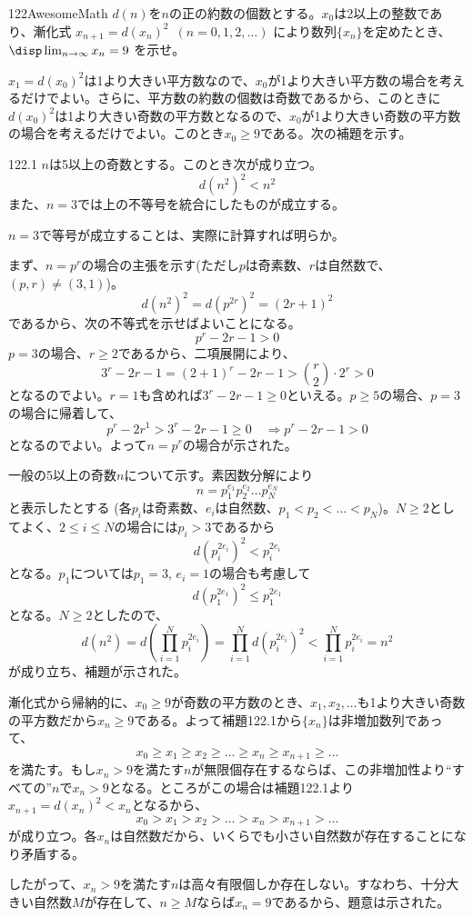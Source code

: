 \begin{prob}{122}{}{AwesomeMath}
 $d(n)$を$n$の正の約数の個数とする。$x_0$は2以上の整数であり、漸化式 $x_{n+1}=d(x_n)^2$~$(n=0, 1, 2, \ldots)$ により数列$\{x_n\}$を定めたとき、$\disp \lim_{n\to\infty} x_n = 9$ を示せ。
\end{prob}

$x_1=d(x_0)^2$は1より大きい平方数なので、$x_0$が1より大きい平方数の場合を考えるだけでよい。さらに、平方数の約数の個数は奇数であるから、このときに$d(x_0)^2$は1より大きい奇数の平方数となるので、$x_0$が1より大きい奇数の平方数の場合を考えるだけでよい。このとき$x_0\ge 9$である。次の補題を示す。

\begin{subthm}{122.1}
 $n$は5以上の奇数とする。このとき次が成り立つ。
 \[ d(n^2)^2<n^2 \]
 また、$n=3$では上の不等号を統合にしたものが成立する。
\end{subthm}

$n=3$で等号が成立することは、実際に計算すれば明らか。

まず、$n=p^r$の場合の主張を示す(ただし$p$は奇素数、$r$は自然数で、$(p,r)\neq (3, 1)$)。
\[ d(n^2)^2=d(p^{2r})^2=(2r+1)^2 \]
であるから、次の不等式を示せばよいことになる。
\[ p^r-2r-1>0 \]
$p=3$の場合、$r\ge 2$であるから、二項展開により、
\[ 3^r-2r-1=(2+1)^r-2r-1>\binom{r}{2}\cdot 2^r > 0 \]
となるのでよい。$r=1$も含めれば$3^r-2r-1\ge 0$といえる。$p\ge 5$の場合、$p=3$の場合に帰着して、
\[ p^r-2r^1>3^r-2r-1\ge 0 \quad\Rightarrow p^r-2r-1>0 \]
となるのでよい。よって$n=p^r$の場合が示された。

一般の5以上の奇数$n$について示す。素因数分解により
\[ n=p_1^{e_1}p_2^{e_2}\dots p_N^{e_N} \]
と表示したとする (各$p_i$は奇素数、$e_i$は自然数、$p_1<p_2<\dots <p_N$)。$N\ge 2$としてよく、$2\le i\le N$の場合には$p_i>3$であるから
\[ d(p_i^{2e_i})^2<p_i^{2e_i} \]
となる。$p_1$については$p_1=3$, $e_i=1$の場合も考慮して
\[ d(p_1^{2e_1})^2\le p_1^{2e_1} \]
となる。$N\ge 2$としたので、
\[ d(n^2)=d\left(\prod_{i=1}^N p_i^{2e_i}\right) = \prod_{i=1}^N d(p_i^{2e_i})^2<\prod_{i=1}^Np_i^{2e_i}=n^2 \]
が成り立ち、補題が示された。

漸化式から帰納的に、$x_0\ge 9$が奇数の平方数のとき、$x_1, x_2, \dots$も1より大きい奇数の平方数だから$x_n\ge 9$である。よって補題122.1から$\{x_n\}$は非増加数列であって、
\[ x_0\ge x_1\ge x_2\ge \dots \ge x_n \ge x_{n+1}\ge \dots \]
を満たす。もし$x_n>9$を満たす$n$が無限個存在するならば、この非増加性より``すべての''$n$で$x_n>9$となる。ところがこの場合は補題122.1より$x_{n+1}=d(x_n)^2<x_n$となるから、
\[ x_0>x_1>x_2>\dots > x_n>x_{n+1}>\dots \]
が成り立つ。各$x_n$は自然数だから、いくらでも小さい自然数が存在することになり矛盾する。

したがって、$x_n>9$を満たす$n$は高々有限個しか存在しない。すなわち、十分大きい自然数$M$が存在して、$n\ge M$ならば$x_n=9$であるから、題意は示された。
